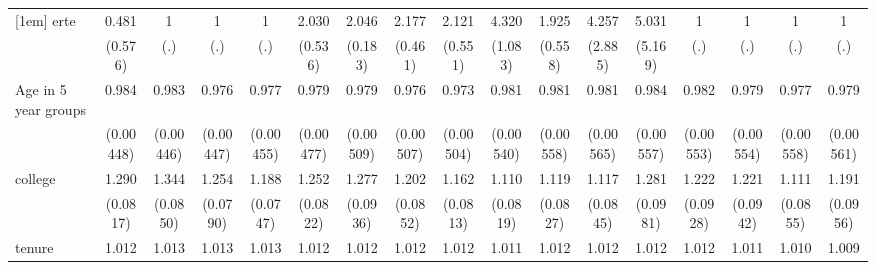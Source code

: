 {\begin{tabular}{l*{16}{c}}
[1em]
erte                &       0.481         &           1         &           1         &           1         &       2.030\sym{**} &       2.046\sym{***}&       2.177\sym{***}&       2.121\sym{**} &       4.320\sym{***}&       1.925\sym{*}  &       4.257\sym{*}  &       5.031         &           1         &           1         &           1         &           1         \\
                    &     (0.576)         &         (.)         &         (.)         &         (.)         &     (0.536)         &     (0.183)         &     (0.461)         &     (0.551)         &     (1.083)         &     (0.558)         &     (2.885)         &     (5.169)         &         (.)         &         (.)         &         (.)         &         (.)         \\
[1em]
Age in 5 year groups&       0.984\sym{***}&       0.983\sym{***}&       0.976\sym{***}&       0.977\sym{***}&       0.979\sym{***}&       0.979\sym{***}&       0.976\sym{***}&       0.973\sym{***}&       0.981\sym{***}&       0.981\sym{***}&       0.981\sym{**} &       0.984\sym{**} &       0.982\sym{**} &       0.979\sym{***}&       0.977\sym{***}&       0.979\sym{***}\\
                    &   (0.00448)         &   (0.00446)         &   (0.00447)         &   (0.00455)         &   (0.00477)         &   (0.00509)         &   (0.00507)         &   (0.00504)         &   (0.00540)         &   (0.00558)         &   (0.00565)         &   (0.00557)         &   (0.00553)         &   (0.00554)         &   (0.00558)         &   (0.00561)         \\
[1em]
college             &       1.290\sym{***}&       1.344\sym{***}&       1.254\sym{***}&       1.188\sym{**} &       1.252\sym{***}&       1.277\sym{***}&       1.202\sym{**} &       1.162\sym{*}  &       1.110         &       1.119         &       1.117         &       1.281\sym{**} &       1.222\sym{**} &       1.221\sym{**} &       1.111         &       1.191\sym{*}  \\
                    &    (0.0817)         &    (0.0850)         &    (0.0790)         &    (0.0747)         &    (0.0822)         &    (0.0936)         &    (0.0852)         &    (0.0813)         &    (0.0819)         &    (0.0827)         &    (0.0845)         &    (0.0981)         &    (0.0928)         &    (0.0942)         &    (0.0855)         &    (0.0956)         \\
[1em]
tenure              &       1.012\sym{***}&       1.013\sym{***}&       1.013\sym{***}&       1.013\sym{***}&       1.012\sym{***}&       1.012\sym{***}&       1.012\sym{***}&       1.012\sym{***}&       1.011\sym{***}&       1.012\sym{***}&       1.012\sym{***}&       1.012\sym{***}&       1.012\sym{***}&       1.011\sym{***}&       1.010\sym{***}&       1.009\sym{***}\\

\end{tabular}}
